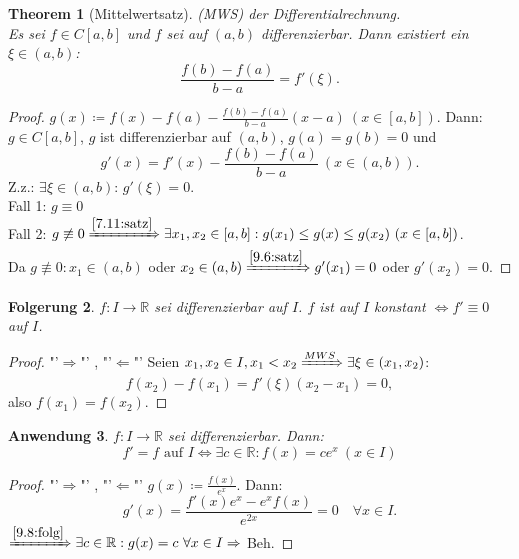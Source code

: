 \documentclass[12pt]{extreport} %
\newcommand{\R}{\mathbb{R}}
\theoremstyle{named}
\newtheorem{unnamedtheorem}{Theorem} \counterwithin{unnamedtheorem}{chapter}
\theoremstyle{dotless}
\newtheorem{folgerung}[unnamedtheorem]{Folgerung}
\newtheorem{anwendung}[unnamedtheorem]{Anwendung}
\begin{document}
\begin{unnamedtheorem}[Mittelwertsatz] \label{9.7:prop-Mittelwertsatz}
	(MWS) der Differentialrechnung. \\
	Es sei $f \in C[a, b]$ und $f$ sei auf $(a, b)$ differenzierbar. Dann existiert ein $\xi \in (a, b)$:
	$$ \frac{f(b) - f(a)}{b - a} = f'(\xi). $$
		
\end{unnamedtheorem}

\begin{proof}
	$g(x) \coloneqq f(x) - f(a) - \frac{f(b) - f(a)}{b - a} (x - a) ~(x \in [a, b])$. Dann: $g \in C[a, b]$, $g$ ist differenzierbar auf $(a, b)$, $g(a) = g(b) = 0$ und 
		$$ g'(x) = f'(x) - \frac{f(b) - f(a)}{b - a} ~(x \in (a, b)). $$
	Z.z.: $\exists \xi \in (a, b)$: $g'(\xi) = 0$. \\
	Fall 1: $g \equiv 0$ \checkmark \\
	Fall 2: $g \not\equiv 0 \xRightarrow[]{\ref{7.11:satz}} \exists x_{1}, x_{2} \in [a, b]: g(x_{1}) \leq g(x) \leq g(x_{2}) ~(x \in [a, b])$. \\
	Da $g \not\equiv 0: x_{1} \in (a, b)$ oder $x_{2} \in (a, b) \xRightarrow[]{\ref{9.6:satz}} g'(x_{1}) = 0$ oder $g'(x_{2}) = 0$.
\end{proof}


\begin{folgerung} \label{9.8:folg}
	$f \colon I \rightarrow \R$ sei differenzierbar auf $I$. $f$ ist auf $I$ konstant $\iff f' \equiv 0$ auf $I$.	
\end{folgerung}

\begin{proof}
	"'$\Rightarrow$"' \checkmark, "'$\Leftarrow$"' Seien $x_{1}, x_{2} \in I, x_{1} < x_{2} \xRightarrow[]{MWS} \exists \xi \in (x_{1}, x_{2})$: 
		$$ f(x_{2}) - f(x_{1}) = f'(\xi) (x_{2} - x_{1}) = 0, $$ 
	also $f(x_{1}) = f(x_{2})$.
\end{proof}


\begin{anwendung} \label{9.9:anwendung}
	$f \colon I \rightarrow \R$ sei differenzierbar. Dann: 
		$$ f' = f \text{ auf } I \iff \exists c \in \R: f(x) = c e^{x} ~(x \in I) $$
\end{anwendung}

\begin{proof}
	"'$\Rightarrow$"' \checkmark, "'$\Leftarrow$"' $g(x) \coloneqq \frac{f(x)}{e^{x}}$. Dann:
	$$ g'(x) = \frac{f'(x) e^{x} - e^{x} f(x)}{e^{2x}} = 0 \quad \forall x \in I. $$
	$\xRightarrow[]{\ref{9.8:folg}} \exists c \in \R: g(x) = c ~\forall x \in I \Rightarrow$ Beh.
\end{proof}
\end{document}
